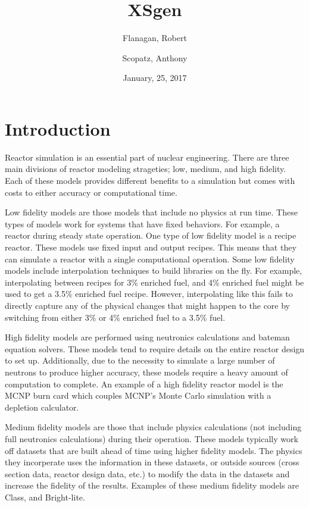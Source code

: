 \documentclass{article}
\begin{document}
\title{XSgen}
\date{January, 25, 2017}
\author{Flanagan, Robert \and Scopatz, Anthony}
\maketitle
\onehalfspacing

\section{Introduction}
Reactor simulation is an essential part of nuclear engineering. There are three main divisions of reactor modeling strageties; low, medium, and high fidelity. Each of these models provides different benefits to a simulation but comes with costs to either accuracy or computational time.  

Low fidelity models are those models that include no physics at run time. These types of models work for systems that have fixed behaviors. For example, a reactor during steady state operation. One type of low fidelity model is a recipe reactor. These models use fixed input and output recipes. This means that they can simulate a reactor with a single computational operation. Some low fidelity models include interpolation techniques to build libraries on the fly. For example, interpolating between recipes for 3\% enriched fuel, and 4\% enriched fuel might be used to get a 3.5\% enriched fuel recipe. However, interpolating like this fails to directly capture any of the physical changes that might happen to the core by switching from either 3\% or 4\% enriched fuel to a 3.5\% fuel.

High fidelity models are performed using neutronics calculations and bateman equation solvers. These models tend to require details on the entire reactor design to set up. Additionally, due to the necessity to simulate a large number of neutrons to produce higher accuracy, these models require a heavy amount of computation to complete. An example of a high fidelity reactor model is the MCNP\cite{mcnp5monte} burn card which couples MCNP's Monte Carlo simulation with a depletion calculator.   

Medium fidelity models are those that include physics calculations (not including full neutronics calculations) during their operation. These models typically work off datasets that are built ahead of time using higher fidelity models. The physics they incorperate uses the information in these datasets, or outside sources (cross section data, reactor design data, etc.) to modify the data in the datasets and increase the fidelity of the results. Examples of these medium fidelity models are Class\cite{class}, and Bright-lite\cite{brightlite}\cite{flanagan}. 
\end{document}
